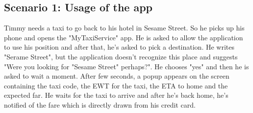 \subsection{Scenario 1: Usage of the app}
Timmy needs a taxi to go back to his hotel in Sesame Street. So he picks up his phone and opens the "MyTaxiService" app.
He is asked to allow the application to use his position and after that, he's asked to pick a destination. He writes "Serame Street", but the application doesn't recognize this place and suggests "Were you looking for "Sesame Street" perhaps?". He chooses "yes" and then he is asked to wait a moment.
After few seconds, a popup appears on the screen containing the taxi code, the EWT for the taxi, the ETA to home and the expected far.
He waits for the taxi to arrive and after he's back home, he's notified of the fare which is directly drawn from his credit card.